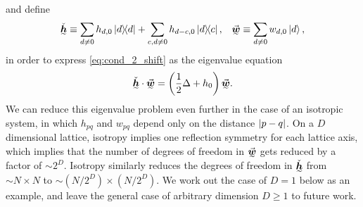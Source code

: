 \documentclass[nofootinbib,notitlepage,11pt]{revtex4-2}
\newcommand{\f}[2]{\dfrac{#1}{#2}} %
\newcommand{\p}[1]{\left(#1\right)} %
\renewcommand{\c}{\cdot} %
\newcommand{\m}{\bm} %
\renewcommand{\v}{\vec} %
\newcommand{\1}{\mathds{1}}
\newcommand{\ut}{\undertilde}
\begin{document}
and define
\begin{align}
  \ut{\check{\m h}}
  \equiv \sum_{d\ne0} h_{d,0} \op{d}
  + \sum_{c,d\ne0} h_{d-c,0} \op{d}{c},
  &&
  \ut{\v{\m w}} \equiv \sum_{d\ne0} w_{d,0} \ket{d},
\end{align}
in order to express \eqref{eq:cond_2_shift} as the eigenvalue
equation
\begin{align}
  \ut{\check{\m h}} \c \ut{\v{\m w}}
  = \p{\f12\Delta + h_0} \ut{\v{\m w}}.
  \label{eq:cond_2_square}
\end{align}
We can reduce this eigenvalue problem even further in the case of an
isotropic system, in which $h_{pq}$ and $w_{pq}$ depend only on the
distance $\abs{p-q}$.  On a $D$ dimensional lattice, isotropy implies
one reflection symmetry for each lattice axis, which implies that the
number of degrees of freedom in $\ut{\v{\m w}}$ gets reduced by a
factor of $\sim 2^D$.  Isotropy similarly reduces the degrees of
freedom in $\ut{\check{\m h}}$ from $\sim N\times N$ to
$\sim\p{N/2^D}\times\p{N/2^D}$.  We work out the case of $D=1$ below
as an example, and leave the general case of arbitrary dimension
$D\ge1$ to future work.
\end{document}
